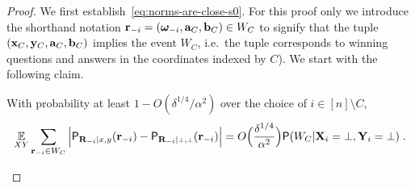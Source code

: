 \begin{proof}
We first establish~\eqref{eq:norms-are-close-s0}. For this proof only we introduce the shorthand notation $\mathbf{r}_{-i} = ({\boldsymbol{\omega}}_{-i},\mathbf{a}_C,\mathbf{b}_C) \in W_C$ to signify that the tuple $(\mathbf{x}_C,\mathbf{y}_C,\mathbf{a}_C,\mathbf{b}_C)$ implies the event $W_C$, i.e.\ the tuple corresponds to winning questions and answers in the coordinates indexed by $C$). We start with the following claim.

\begin{claim}
With probability at least $1 - O(\delta^{1/4}/\alpha^2)$ over the choice of $i \in [n] \setminus C$,
\begin{equation}
\label{eq:norms-are-close-0}
\Ex_{XY} \sum_{\br_\mi \in W_C}  \Big | \P_{\bR_\mi | x,y}(\br_\mi) - \P_{\bR_\mi | \dummy, \dummy}(\br_\mi) \Big | = O\Big(\frac{\delta^{1/4}}{\alpha^2}\Big) \P(W_C | \bX_i = \dummy, \bY_i = \dummy)\;.
\end{equation}
\end{claim}


\end{proof}
